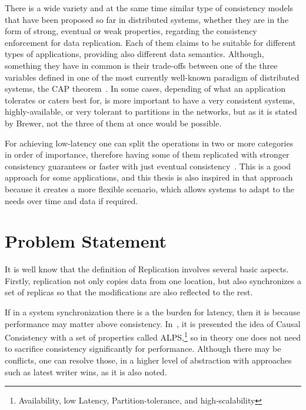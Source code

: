 There is a wide variety and at the same time similar type of consistency models that have been proposed so far in distributed systems, whether they are in the form of strong, eventual or weak properties, regarding the consistency enforcement for data replication. Each of them claims to be suitable for different types of applications, providing also different data semantics. Although, something they have in common is their trade-offs between one of the three variables defined in one of the most currently well-known paradigm of distributed systems, the CAP theorem~\cite{Brewer:2002}. In some cases, depending of what an application tolerates or caters best for, is more important to have a very consistent systems, highly-available, or very tolerant to partitions in the networks, but as it is stated by Brewer, not the three of them at once would be possible.

%
%

For achieving low-latency one can split the operations in two or more categories in order of importance, therefore having some of them replicated with stronger consistency guarantees or faster with just eventual consistency~\cite{Li:2012}. This is a good approach for some applications, and this thesis is also inspired in that approach because it creates a more flexible scenario, which allows systems to adapt to the needs over time and data if required.


\section{Problem Statement}
It is well know that the definition of Replication involves several basic aspects. Firstly, replication not only copies data from one location, but also synchronizes a set of replicas so that the modifications are also reflected to the rest.

If in a system synchronization there is a the burden for latency, then it is because performance may matter above consistency. In~\cite{Lloyd:2011}, it is presented the idea of Causal Consistency with a set of properties called ALPS,\footnote{Availability, low Latency, Partition-tolerance, and high-scalability} so in theory one does not need to sacrifice consistency significantly for performance. Although there may be conflicts, one can resolve those, in a higher level of abstraction with approaches such as latest writer wins, as it is also noted.

